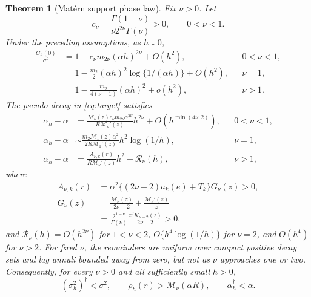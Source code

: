 \documentclass[sigconf]{acmart}
\newtheorem{theorem}{Theorem}
\theoremstyle{remark}
\newcommand{\Matern}{\mathcal M}
\begin{document}
\begin{theorem}[Matérn support phase law]
\label{thm:phase-law}
Fix \(\nu>0\).
Let
\[
c_\nu=\frac{\Gamma(1-\nu)}
{\nu2^{2\nu}\Gamma(\nu)}>0,\qquad 0<\nu<1.
\]
Under the preceding assumptions, as \(h\downarrow0\),
\begin{align}
\frac{C_h(0)}{\sigma^2}
&=1-c_\nu m_{2\nu}(\alpha h)^{2\nu}+O(h^2),
&&0<\nu<1, \label{eq:vrough}\\
&=1-\frac{m_2}{2}(\alpha h)^2\log\{1/(\alpha h)\}+O(h^2),
&&\nu=1, \label{eq:vone}\\
&=1-\frac{m_2}{4(\nu-1)}(\alpha h)^2+o(h^2),
&&\nu>1. \label{eq:vsmooth}
\end{align}
The pseudo-decay in \eqref{eq:target} satisfies
\begin{align}
\alpha_h^\dagger-\alpha
&=\frac{\Matern_\nu(z)c_\nu m_{2\nu}\alpha^{2\nu}}
{R\Matern_\nu'(z)}h^{2\nu}
+O\!\left(h^{\min(4\nu,2)}\right),
&&0<\nu<1, \label{eq:arough}\\
\alpha_h^\dagger-\alpha
&\sim\frac{m_2\Matern_1(z)\alpha^2}
{2R\Matern_1'(z)}h^2\log(1/h),
&&\nu=1, \label{eq:aone}\\
\alpha_h^\dagger-\alpha
&=\frac{A_{\nu,k}(r)}{R\Matern_\nu'(z)}h^2+\mathcal R_\nu(h),
&&\nu>1, \label{eq:asmooth}
\end{align}
where
\begin{align}
A_{\nu,k}(r)
&=\alpha^2\{(2\nu-2)a_k(e)+T_k\}G_\nu(z)>0,\\
G_\nu(z)
&=\frac{\Matern_\nu(z)}{2\nu-2}+\frac{\Matern_\nu'(z)}z\\
&=\frac{2^{1-\nu}}{\Gamma(\nu)}
\frac{z^\nu K_{\nu-2}(z)}{2\nu-2}>0,
\end{align}
and \(\mathcal R_\nu(h)=O(h^{2\nu})\) for \(1<\nu<2\),
\(O\{h^4\log(1/h)\}\) for \(\nu=2\), and \(O(h^4)\) for \(\nu>2\).
For fixed \(\nu\), the remainders are uniform over compact positive decay sets
and lag annuli bounded away from zero, but not as \(\nu\) approaches one or two.
Consequently, for every \(\nu>0\) and all sufficiently small \(h>0\),
\[
(\sigma_h^2)^\dagger<\sigma^2,\qquad
\rho_h(r)>\Matern_\nu(\alpha R),\qquad
\alpha_h^\dagger<\alpha.
\]
\end{theorem}
\end{document}
